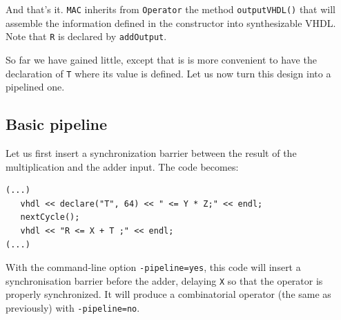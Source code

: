 \documentclass{article}
\begin{document}
And that's it. \verb!MAC! inherits from \verb!Operator! the method
\verb!outputVHDL()! that will assemble the information defined in the
constructor into synthesizable VHDL. Note that \verb!R! is declared by \verb!addOutput!.

So far we have gained little, except that is is more convenient to
have the declaration of \verb!T! where its value is defined. Let us
now turn this design into a pipelined one.


\subsection{Basic pipeline}

Let us first insert a synchronization barrier between the result of the
multiplication and the adder input. The code becomes: 

\begin{verbatim}
(...)
   vhdl << declare("T", 64) << " <= Y * Z;" << endl;
   nextCycle();
   vhdl << "R <= X + T ;" << endl;
(...)
\end{verbatim}

With the command-line option \verb!-pipeline=yes!, this code will
insert a synchronisation barrier before the adder, delaying \texttt{X}
so that the operator is properly synchronized. It will produce a
combinatorial operator (the same as previously) with
\verb!-pipeline=no!.
\end{document}
